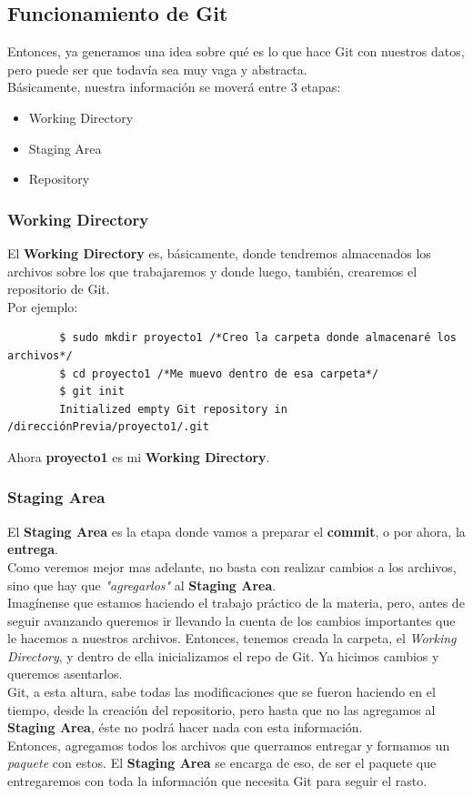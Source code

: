 \documentclass[a4paper, 12pt]{article}
\begin{document}
\subsection{Funcionamiento de Git}

Entonces, ya generamos una idea sobre qué es lo que hace Git con nuestros datos, pero puede ser que todavía sea muy vaga y abstracta.\\

Básicamente, nuestra información se moverá entre 3 etapas:

\begin{itemize}
\item Working Directory
\item Staging Area
\item Repository
\end{itemize}

\subsubsection{Working Directory}
El \textbf{Working Directory} es, básicamente, donde tendremos almacenados los archivos sobre los que trabajaremos y donde luego, también, crearemos el repositorio de Git.\\
Por ejemplo:

\begin{verbatim}
        $ sudo mkdir proyecto1 /*Creo la carpeta donde almacenaré los archivos*/
        $ cd proyecto1 /*Me muevo dentro de esa carpeta*/
        $ git init
        Initialized empty Git repository in /direcciónPrevia/proyecto1/.git
\end{verbatim} 

Ahora \textbf{proyecto1} es mi \textbf{Working Directory}.

\subsubsection{Staging Area}
El \textbf{Staging Area} es la etapa donde vamos a preparar el \textbf{commit}, o por ahora, la \textbf{entrega}.\\

Como veremos mejor mas adelante, no basta con realizar cambios a los archivos, sino que hay que \textit{"agregarlos"} al \textbf{Staging Area}.\\
Imagínense que estamos haciendo el trabajo práctico de la materia, pero, antes de seguir avanzando queremos ir llevando la cuenta de los cambios importantes que le hacemos a nuestros archivos. Entonces, tenemos creada la carpeta, el \textit{Working Directory}, y dentro de ella inicializamos el repo de Git. Ya hicimos cambios y queremos asentarlos.\\
Git, a esta altura, sabe todas las modificaciones que se fueron haciendo en el tiempo, desde la creación del repositorio, pero hasta que no las agregamos al \textbf{Staging Area}, éste no podrá hacer nada con esta información.\\
Entonces, agregamos todos los archivos que querramos entregar y formamos un \textit{paquete} con estos.
El \textbf{Staging Area} se encarga de eso, de ser el paquete que entregaremos con toda la información que necesita Git para seguir el rasto.
\end{document}
